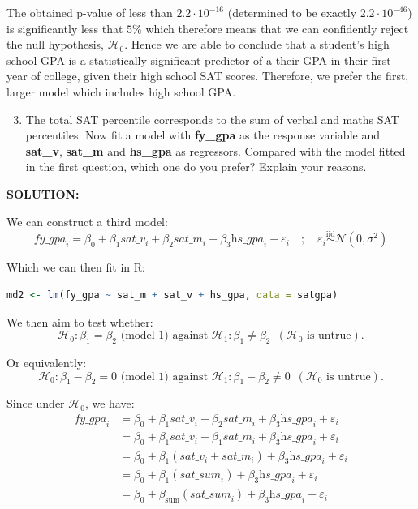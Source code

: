 \documentclass[]{article}
\begin{document}
\noindent The obtained p-value of less than $2.2\cdot 10^{-16}$ (determined to be exactly $2.2\cdot 10^{-46}$) is significantly less that $5\%$ which therefore means that we can confidently reject the null hypothesis, $\mathcal{H}_0$. Hence we are able to conclude that a student's high school GPA is a statistically significant predictor of a their GPA in their first year of college, given their high school SAT scores. Therefore, we prefer the first, larger model which includes high school GPA.\newline

\begin{enumerate}
\setcounter{enumi}{2}  
\item The total SAT percentile corresponds to the sum of verbal and
maths SAT percentiles. Now fit a model with \textbf{fy\_gpa} as the response variable
and \textbf{sat\_v}, \textbf{sat\_m} and \textbf{hs\_gpa} as regressors. Compared with the model fitted in the first question, which one do you prefer? Explain your reasons.
\end{enumerate}

\noindent \textbf{SOLUTION:}\newline

\noindent We can construct a third model:
\[
\textit{fy\_gpa}_i = \beta_0 + \beta_1 \textit{sat\_v}_i + \beta_2 \textit{sat\_m}_i + \beta_3 \textit{hs\_gpa}_i+ \varepsilon_i \quad;\quad \varepsilon_i\overset{\text{iid}}{\sim}\mathcal{N}(0,\sigma^2)
\]

\noindent Which we can then fit in \textsf{R}:

\begin{lstlisting}[language=R]
md2 <- lm(fy_gpa ~ sat_m + sat_v + hs_gpa, data = satgpa)
\end{lstlisting}

\noindent We then aim to test whether:
\[
\mathcal{H}_0:\beta_1=\beta_2 \text{ (model 1)    against     }\mathcal{H}_1: \beta_1 \neq \beta_2 \,\,\,(\mathcal{H}_0\text{ is untrue}).
\]

\noindent Or equivalently:
\[
\mathcal{H}_0:\beta_1-\beta_2=0 \text{ (model 1)    against     }\mathcal{H}_1: \beta_1 - \beta_2 \neq 0  \,\,\,(\mathcal{H}_0\text{ is untrue}).
\]


\noindent Since under $\mathcal{H}_0$, we have:
\begin{align*}
\textit{fy\_gpa}_i &= \beta_0 + \beta_1 \textit{sat\_v}_i + \beta_2 \textit{sat\_m}_i + \beta_3 \textit{hs\_gpa}_i+ \varepsilon_i\\
&= \beta_0 + \beta_1 \textit{sat\_v}_i + \beta_1 \textit{sat\_m}_i + \beta_3 \textit{hs\_gpa}_i+ \varepsilon_i\\
&=\beta_0 + \beta_1 \left(\textit{sat\_v}_i +\textit{sat\_m}_i\right) + \beta_3 \textit{hs\_gpa}_i+ \varepsilon_i\\
&=\beta_0 + \beta_1 \left(\textit{sat\_sum}_i\right) + \beta_3 \textit{hs\_gpa}_i+ \varepsilon_i\\
&=\beta_0 + \beta_{\text{sum}} \left(\textit{sat\_sum}_i\right) + \beta_3 \textit{hs\_gpa}_i+ \varepsilon_i
\end{align*}
\end{document}
